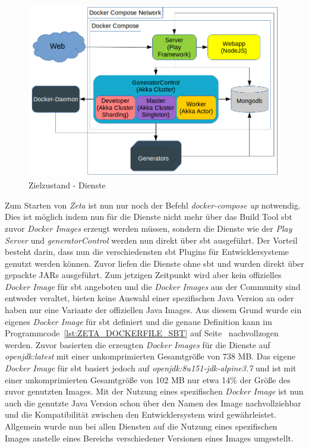 \begin{figure}
    \centering
    \includegraphics[width=5in]{figures/docker-compose-final.png}
    \caption{Zielzustand - Dienste}
    \label{fig:ZETA_ARCH_NEW}
\end{figure}

Zum Starten von \textit{Zeta} ist nun nur noch der Befehl \textit{docker-compose up} notwendig. Dies ist möglich indem nun für die Dienste nicht mehr über das Build Tool \ac{sbt} zuvor \textit{Docker Images} erzeugt werden müssen, sondern die Dienste wie der \textit{Play Server} und \textit{generatorControl} werden nun direkt über \ac{sbt} ausgeführt. Der Vorteil besteht darin, dass nun die verschiedensten \ac{sbt} Plugins für Entwicklersysteme genutzt werden können. Zuvor liefen die Dienste ohne \ac{sbt} und wurden direkt über gepackte JARs ausgeführt. Zum jetzigen Zeitpunkt wird aber kein offizielles \textit{Docker Image} für \ac{sbt} angeboten und die \textit{Docker Images} aus der Community sind entweder veraltet, bieten keine Auswahl einer spezifischen Java Version an oder haben nur eine Variante der offiziellen Java Images. Aus diesem Grund wurde ein eigenes \textit{Docker Image} für \ac{sbt} definiert und die genaue Definition kann im Programmcode~\ref{lst:ZETA_DOCKERFILE_SBT} auf Seite~\pageref{lst:ZETA_DOCKERFILE_SBT} nachvollzogen werden. Zuvor basierten die erzeugten \textit{Docker Images} für die Dienste auf \textit{openjdk:latest} mit einer unkomprimierten Gesamtgröße von 738 MB. Das eigene \textit{Docker Image} für \ac{sbt} basiert jedoch auf \textit{openjdk:8u151-jdk-alpine3.7} und ist mit einer unkomprimierten Gesamtgröße von 102 MB nur etwa 14\% der Größe des zuvor genutzten Images. Mit der Nutzung eines spezifischen \textit{Docker Image} ist nun auch die genutzte Java Version schon über den Namen des Image nachvollziehbar und die Kompatibilität zwischen den Entwicklersystem wird gewährleistet. Allgemein wurde nun bei allen Diensten auf die Nutzung eines spezifischen Images anstelle eines Bereichs verschiedener Versionen eines Images umgestellt.

